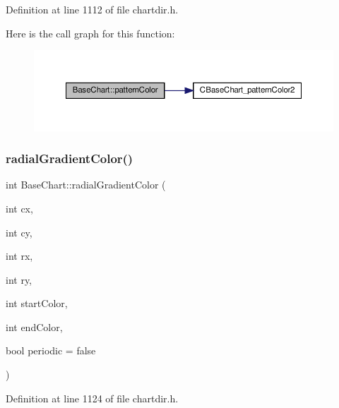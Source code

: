 Definition at line 1112 of file chartdir.\+h.

Here is the call graph for this function\+:
\nopagebreak
\begin{figure}[H]
\begin{center}
\leavevmode
\includegraphics[width=350pt]{class_base_chart_a5938beff89dc799bdfd12663caa65aff_cgraph}
\end{center}
\end{figure}
\mbox{\label{class_base_chart_ad6996ebdeebe20e9a709726867bc5b77}} 
\subsubsection{\texorpdfstring{radial\+Gradient\+Color()}{radialGradientColor()}\hspace{0.1cm}{\footnotesize\ttfamily [1/2]}}
{\footnotesize\ttfamily int Base\+Chart\+::radial\+Gradient\+Color (\begin{DoxyParamCaption}\item[{int}]{cx,  }\item[{int}]{cy,  }\item[{int}]{rx,  }\item[{int}]{ry,  }\item[{int}]{start\+Color,  }\item[{int}]{end\+Color,  }\item[{bool}]{periodic = {\ttfamily false} }\end{DoxyParamCaption})\hspace{0.3cm}{\ttfamily [inline]}}



Definition at line 1124 of file chartdir.\+h.

